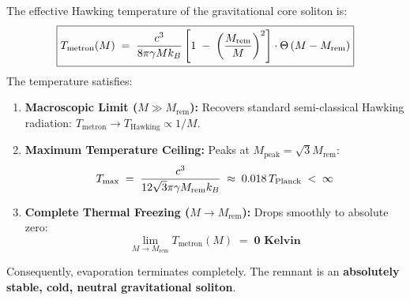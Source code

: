 \documentclass[
    12pt,
    a4paper,
    headings=normal,
    twoside=false,
    open=any,
    parskip=half
]{scrbook}
\let\hbar\relax
\begin{document}
\begin{phystheorem}\label{thm:ch9_hawking_freezing_theorem}
The effective Hawking temperature of the gravitational core soliton is:
\begin{equation}
\boxed{T_{\text{metron}}(M) \;=\; \frac{\hbar c^3}{8\pi \gamma M k_B} \left[ 1 \;-\; \left( \frac{M_{\text{rem}}}{M} \right)^2 \right] \cdot \Theta\left( M - M_{\text{rem}} \right)}
\label{eq:ch9_modified_temperature_formula}
\end{equation}
The temperature satisfies:
\begin{enumerate}[label=(\alph*), noitemsep]
    \item \textbf{Macroscopic Limit ($M \gg M_{\text{rem}}$):} Recovers standard semi-classical Hawking radiation: $T_{\text{metron}} \to T_{\text{Hawking}} \propto 1/M$.
    \item \textbf{Maximum Temperature Ceiling:} Peaks at $M_{\text{peak}} = \sqrt{3}M_{\text{rem}}$:
    \begin{equation}
    T_{\max} \;=\; \frac{\hbar c^3}{12\sqrt{3}\pi \gamma M_{\text{rem}} k_B} \;\approx\; 0.018 \, T_{\text{Planck}} \;<\; \infty
    \end{equation}
    \item \textbf{Complete Thermal Freezing ($M \to M_{\text{rem}}$):} Drops smoothly to absolute zero:
    \begin{equation}
    \lim_{M \to M_{\text{rem}}} T_{\text{metron}}(M) \;=\; \mathbf{0 \text{ Kelvin}}
    \end{equation}
\end{enumerate}
Consequently, evaporation terminates completely. The remnant is an \textbf{absolutely stable, cold, neutral gravitational soliton}.
\end{phystheorem}
\end{document}
